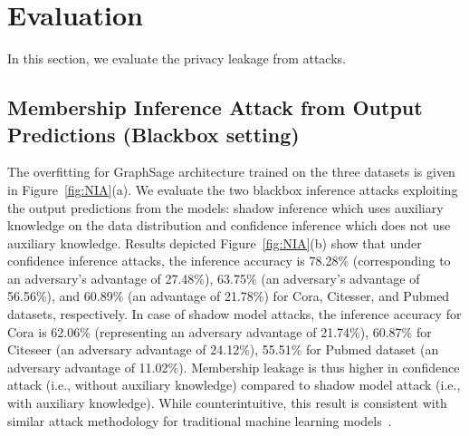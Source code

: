 \section{Evaluation}\label{evaluation}

In this section, we evaluate the privacy leakage from attacks.

\subsection{Membership Inference Attack from Output Predictions {\large(Blackbox setting)}}


The overfitting for GraphSage architecture trained on the three datasets is given in Figure~\ref{fig:NIA}(a).
We evaluate the two blackbox inference attacks exploiting the output predictions from the models: shadow inference which uses auxiliary knowledge on the data distribution and confidence inference which does not use auxiliary knowledge.
Results depicted Figure~\ref{fig:NIA}(b) show that under confidence inference attacks, the inference accuracy is 78.28\% (corresponding to an adversary's advantage of 27.48\%), 63.75\% (an adversary's advantage of 56.56\%), and 60.89\% (an advantage of 21.78\%) for Cora, Citesser, and Pubmed datasets, respectively.
In case of shadow model attacks, the inference accuracy for Cora is 62.06\% (representing an adversary advantage of 21.74\%), 60.87\% for Citeseer (an adversary advantage of 24.12\%), 55.51\% for Pubmed dataset (an adversary advantage of 11.02\%).
Membership leakage is thus higher in confidence attack (i.e., without auxiliary knowledge) compared to shadow model attack (i.e., with auxiliary knowledge). While counterintuitive, this result is consistent with similar attack methodology for traditional machine learning models~\cite{princeton}.


